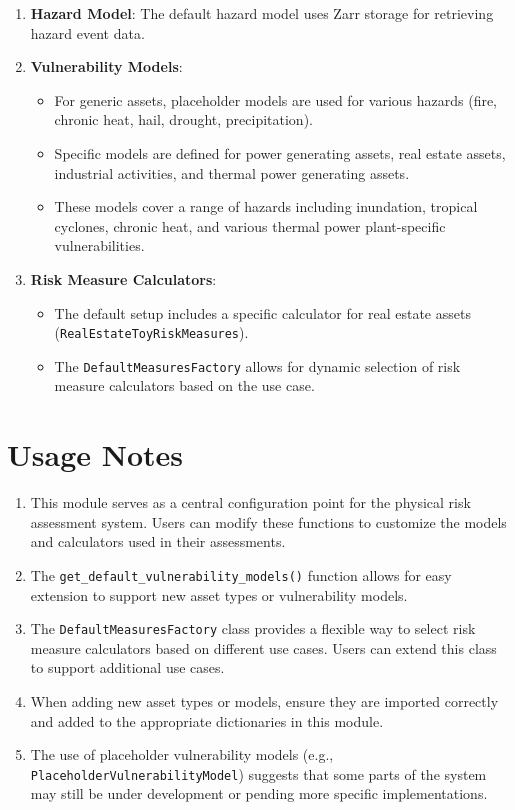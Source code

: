\documentclass{article}
\begin{document}
\begin{enumerate}
    \item \textbf{Hazard Model}: The default hazard model uses Zarr storage for retrieving hazard event data.

    \item \textbf{Vulnerability Models}: 
    \begin{itemize}
        \item For generic assets, placeholder models are used for various hazards (fire, chronic heat, hail, drought, precipitation).
        \item Specific models are defined for power generating assets, real estate assets, industrial activities, and thermal power generating assets.
        \item These models cover a range of hazards including inundation, tropical cyclones, chronic heat, and various thermal power plant-specific vulnerabilities.
    \end{itemize}

    \item \textbf{Risk Measure Calculators}: 
    \begin{itemize}
        \item The default setup includes a specific calculator for real estate assets (\texttt{RealEstateToyRiskMeasures}).
        \item The \texttt{DefaultMeasuresFactory} allows for dynamic selection of risk measure calculators based on the use case.
    \end{itemize}
\end{enumerate}

\section{Usage Notes}

\begin{enumerate}
    \item This module serves as a central configuration point for the physical risk assessment system. Users can modify these functions to customize the models and calculators used in their assessments.

    \item The \texttt{get\_default\_vulnerability\_models()} function allows for easy extension to support new asset types or vulnerability models.

    \item The \texttt{DefaultMeasuresFactory} class provides a flexible way to select risk measure calculators based on different use cases. Users can extend this class to support additional use cases.

    \item When adding new asset types or models, ensure they are imported correctly and added to the appropriate dictionaries in this module.

    \item The use of placeholder vulnerability models (e.g., \texttt{PlaceholderVulnerabilityModel}) suggests that some parts of the system may still be under development or pending more specific implementations.
\end{enumerate}
\end{document}
